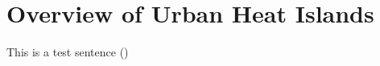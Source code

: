 %
%
%
%
%
%
%
%
%

\section{Overview of Urban Heat Islands}

This is a test sentence (\cite{Ziter2019})
